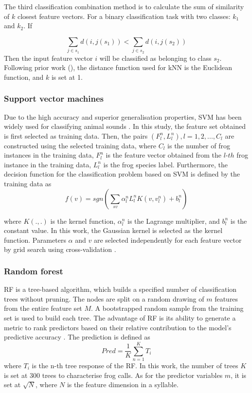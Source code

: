 The third classification combination method is to calculate the sum of similarity of $k$ closest feature vectors. For a binary classification task with two classes: $k_{1}$ and $k_{2}$. If

\begin{equation}
\sum_{j \in s_{1}} d(i,j(s_{1})) < \sum_{j \in s_{2}}d(i,j(s_{2}))
\end{equation}
Then the input feature vector $i$ will be classified as belonging to class $s_{2}$. Following prior work (\citep{han2011acoustic, Xie1504:Acoustic}), the distance function used for kNN is the Euclidean function, and $k$ is set at 1.

\subsubsection{Support vector machines}
Due to the high accuracy and superior generalisation properties, SVM has been widely used for classifying animal sounds \citep{huang2009frog} \citep{acevedo2009automated}. In this study, the feature set obtained is first selected as training data. Then, the pairs $(F_{l}^{n},L_{l}^{n}), l=1,2,..., C_{l}$ are constructed using the selected training data, where $C_{l}$ is the number of frog instances in the training data, $F_{l}^{n}$ is the feature vector obtained from the $l$-$th$ frog instance in the training data, $L_{l}^{n}$ is the frog species label. Furthermore, the decision function for the classification problem based on SVM \citep{cortes1995support} is defined by the training data as 
\begin{equation}
f(v) = sgn(\sum_{sv}\alpha_{l}^{n}L_{l}^{n}K(v,v_{l}^{n})+b_{l}^{n})
\end{equation}

where $K(.,.)$ is the kernel function, $\alpha_{l}^{n}$ is the Lagrange multiplier, and $b_{l}^{n}$ is the constant value. In this work, the Gaussian kernel is selected as the kernel function. Parameters $\alpha$ and $v$ are selected independently for each feature vector by grid search using cross-validation \citep{hsu2003practical}.


\subsubsection{Random forest}
RF is a tree-based algorithm, which builds a specified number of classification trees without pruning. The nodes are split on a random drawing of $m$ features
from the entire feature set $M$. A bootstrapped random sample from the training set is used to build each tree. The advantage of RF is its ability to generate a metric to rank predictors based on their relative contribution to the model's predictive accuracy \citep{bao2005prediction}. The prediction is defined as
\begin{equation}
Pred = \frac{1}{K}\sum_{n=1}^{K}T_{i}
\end{equation}
where $T_{i}$ is the n-th tree response of the RF. In this work, the number of trees $K$ is set at 300 trees to characterise frog calls. As for the predictor variables $m$, it is set at $\sqrt{N}$, where $N$ is the feature dimension in a syllable. 


